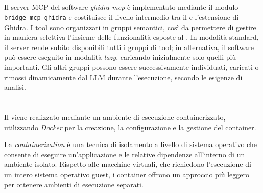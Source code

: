 
\subsection{\sremcpserver{}} %

Il server MCP del software \emph{ghidra-mcp} è implementato mediante il modulo \texttt{bridge\_mcp\_ghidra} \cite{bethington2026ghidramcp} e costituisce il livello intermedio tra il \sremcpclient{} e l'estensione di Ghidra. I tool sono organizzati in gruppi semantici, così da permettere di gestire in maniera selettiva l'insieme delle funzionalità esposte al \llm{}. In modalità standard, il server rende subito disponibili tutti i gruppi di tool; in alternativa, il software può essere eseguito in modalità \emph{lazy}, caricando inizialmente solo quelli più importanti. Gli altri gruppi possono essere successivamente individuati, caricati o rimossi dinamicamente dal LLM durante l'esecuzione, secondo le esigenze di analisi.




\section{\sandbox{}} \label{sec:sandbox} %

Il \sandbox{} viene realizzato mediante un ambiente di esecuzione containerizzato, utilizzando \emph{Docker} \cite{docker2026container} per la creazione, la configurazione e la gestione del container.

La \emph{containerization} è una tecnica di isolamento a livello di sistema operativo che consente di eseguire un'applicazione e le relative dipendenze all'interno di un ambiente isolato. Rispetto alle macchine virtuali, che richiedono l'esecuzione di un intero sistema operativo guest, i container offrono un approccio più leggero per ottenere ambienti di esecuzione separati.

